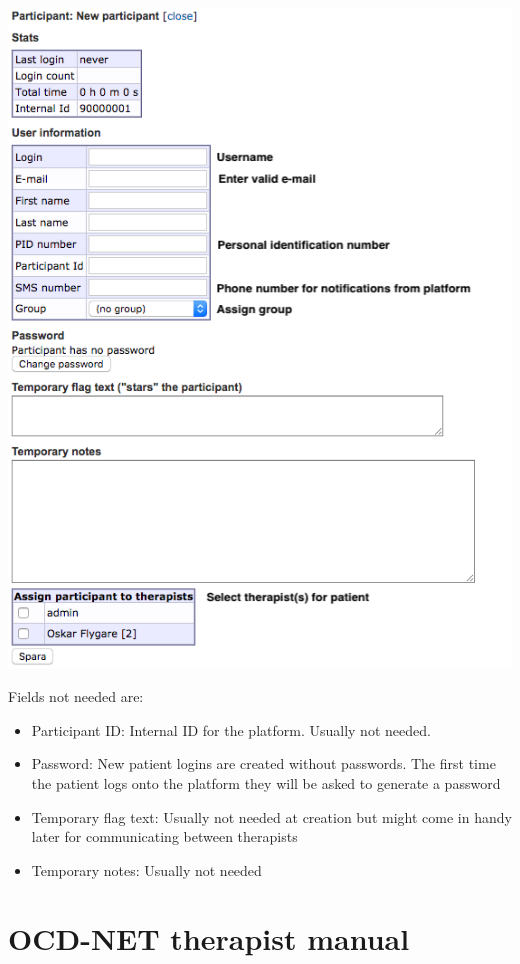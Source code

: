 \documentclass[]{book}
\providecommand{\tightlist}{%
  \setlength{\itemsep}{0pt}\setlength{\parskip}{0pt}}
\theoremstyle{definition}
\theoremstyle{definition}
\theoremstyle{definition}
\theoremstyle{remark}
\begin{document}
\includegraphics{images/new-participant.png}

Fields not needed are:

\begin{itemize}
\tightlist
\item
  Participant ID: Internal ID for the platform. Usually not needed.
\item
  Password: New patient logins are created without passwords. The first
  time the patient logs onto the platform they will be asked to generate
  a password
\item
  Temporary flag text: Usually not needed at creation but might come in
  handy later for communicating between therapists
\item
  Temporary notes: Usually not needed
\end{itemize}

\hypertarget{ocd-net-therapist-manual}{%
\chapter{OCD-NET therapist manual}\label{ocd-net-therapist-manual}}
\end{document}
